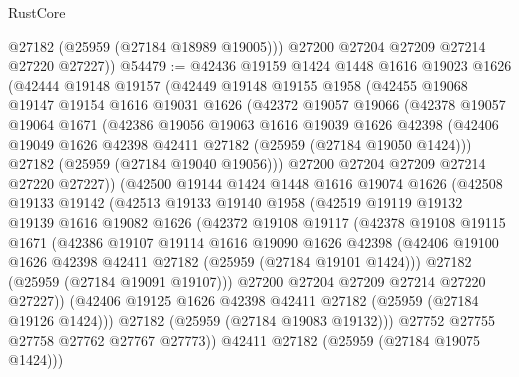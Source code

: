 \begin{lexlean}{RustCore}
\begin{coremodule}
          @27182
          (@25959 (@27184 @18989 @19005)))
        @27200
        @27204
        @27209
        @27214
        @27220
        @27227))
@54479 := @42436
    @19159
    @1424
    @1448
    @1616
    @19023
    @1626
    (@42444
      @19148
      @19157
      (@42449
        @19148
        @19155
        @1958
        (@42455
          @19068
          @19147
          @19154
          @1616
          @19031
          @1626
          (@42372
            @19057
            @19066
            (@42378
              @19057
              @19064
              @1671
              (@42386
                @19056
                @19063
                @1616
                @19039
                @1626
                @42398
                (@42406 @19049 @1626 @42398 @42411 @27182 (@25959 (@27184 @19050 @1424)))
                @27182
                (@25959 (@27184 @19040 @19056)))
              @27200
              @27204
              @27209
              @27214
              @27220
              @27227))
          (@42500
            @19144
            @1424
            @1448
            @1616
            @19074
            @1626
            (@42508
              @19133
              @19142
              (@42513
                @19133
                @19140
                @1958
                (@42519
                  @19119
                  @19132
                  @19139
                  @1616
                  @19082
                  @1626
                  (@42372
                    @19108
                    @19117
                    (@42378
                      @19108
                      @19115
                      @1671
                      (@42386
                        @19107
                        @19114
                        @1616
                        @19090
                        @1626
                        @42398
                        (@42406 @19100 @1626 @42398 @42411 @27182 (@25959 (@27184 @19101 @1424)))
                        @27182
                        (@25959 (@27184 @19091 @19107)))
                      @27200
                      @27204
                      @27209
                      @27214
                      @27220
                      @27227))
                  (@42406 @19125 @1626 @42398 @42411 @27182 (@25959 (@27184 @19126 @1424)))
                  @27182
                  (@25959 (@27184 @19083 @19132)))
                @27752
                @27755
                @27758
                @27762
                @27767
                @27773))
            @42411
            @27182
            (@25959 (@27184 @19075 @1424)))

\end{coremodule}
\end{lexlean}
